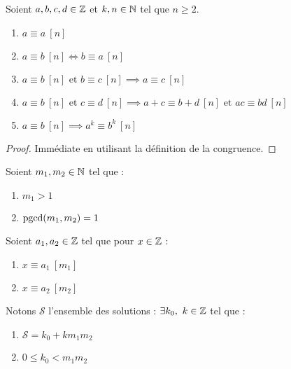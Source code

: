 \begin{proposition}
	Soient $a, b, c, d \in \mathbb{Z}$ et $k, n \in \mathbb{N}$ tel que $n \geq 2$.
	\begin{enumerate}
		\item $a \equiv a \ [n]$ 
		\item $a \equiv b \ [n] \iff b \equiv a \ [n]$ 
		\item $a \equiv b \ [n] \text{ et } b \equiv c  \ [n] \implies a \equiv c \ [n]$
		\item $a \equiv b \ [n] \text{ et } c \equiv d     \ [n] \implies a + c \equiv b + d \ [n] \text{ et } ac \equiv bd \ [n]$
		\item $a \equiv b \ [n] \implies a^k \equiv b^k \ [n]$
	\end{enumerate}
\end{proposition}

\begin{proof}
	Immédiate en utilisant la définition de la congruence.
\end{proof}

\begin{theorem}
	Soient $m_1, m_2 \in \mathbb{N}$ tel que :
	\begin{enumerate}
		\item $m_1 > 1$
		\item $\operatorname{pgcd}(m_1, m_2) = 1$
	\end{enumerate}
	Soient $a_1, a_2 \in \mathbb{Z}$ tel que pour $x \in \mathbb{Z}$ :
	\begin{enumerate}
		\item $x \equiv a_1 \ [m_1]$
		\item $x \equiv a_2 \ [m_2]$
	\end{enumerate}
	Notons $\mathcal{S}$ l'ensemble des solutions :
	$\exists k_0,\ k \in \mathbb{Z}$ tel que :
	\begin{enumerate}
		\item $\mathcal{S} = k_0 + k m_1 m_2$ 
		\item $0 \leq k_0 < m_1 m_2$
	\end{enumerate}
\end{theorem}

